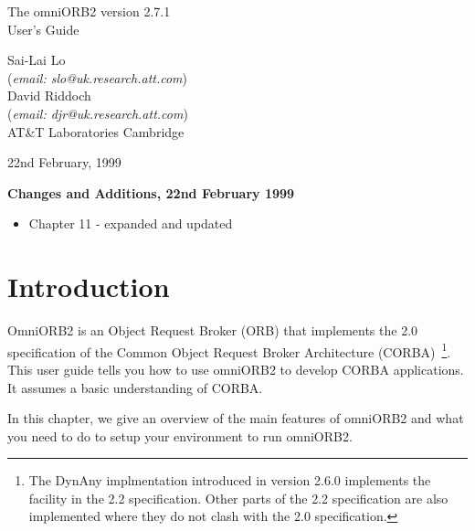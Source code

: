 \documentclass[11pt,twoside,onecolumn]{book}
\begin{document}
\pagestyle{empty}


\begin{center}

\vfill

{ \Huge
The omniORB2 version 2.7.1\\[4mm]
User's Guide
}

\vfill

{ \Large
Sai-Lai Lo\\
{\normalsize ({\it email: slo@uk.research.att.com})}\\
David Riddoch\\
{\normalsize ({\it email: djr@uk.research.att.com})}\\
AT\&T Laboratories Cambridge\\
}


\vfill
\vfill
22nd February, 1999
\vfill

\end{center}

\pagebreak

{\Large \bf \sf Changes and Additions, 22nd February 1999}

\begin{itemize}
\item Chapter 11 - expanded and updated
\end{itemize}


\cleardoublepage
\tableofcontents
\cleardoublepage
\pagestyle{headings}


\mainmatter

%
\chapter{Introduction}

OmniORB2 is an Object Request Broker (ORB) that implements the 2.0
specification of the Common Object Request Broker Architecture
(CORBA)~\cite{corba2-spec}\footnote{The DynAny implmentation introduced in
version 2.6.0 implements the facility in the 2.2 specification. Other parts
of the 2.2 specification are also implemented where they do not clash
with the 2.0 specification.}.
This user guide tells you how to use omniORB2 to develop CORBA applications.
It assumes a basic understanding of CORBA. 

In this chapter, we give an overview of the main features of omniORB2 and
what you need to do to setup your environment to run omniORB2.
\end{document}
